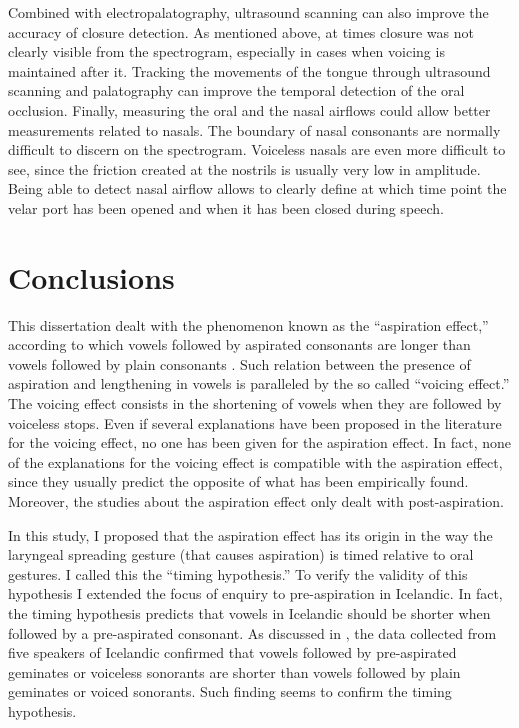 \documentclass[11pt,a4paper,oneside,openany]{memoir}\usepackage[]{graphicx}\usepackage[]{color}
\begin{document}
Combined with electropalatography, ultrasound scanning can also improve the accuracy of closure detection.
As mentioned above, at times closure was not clearly visible from the spectrogram, especially in cases when voicing is maintained after it.
Tracking the movements of the tongue through ultrasound scanning and palatography can improve the temporal detection of the oral occlusion.
Finally, measuring the oral and the nasal airflows could allow better measurements related to nasals.
The boundary of nasal consonants are normally difficult to discern on the spectrogram.
Voiceless nasals are even more difficult to see, since the friction created at the nostrils is usually very low in amplitude.
Being able to detect nasal airflow allows to clearly define at which time point the velar port has been opened and when it has been closed during speech.

















\chapter{Conclusions}
\label{c:conclusions}

This dissertation dealt with the phenomenon known as the ``aspiration effect,'' according to which vowels followed by aspirated consonants are longer than vowels followed by plain consonants \citep{maddieson1976,maddieson1976a}.
Such relation between the presence of aspiration and lengthening in vowels is paralleled by the so called ``voicing effect.''
The voicing effect consists in the shortening of vowels when they are followed by voiceless stops.
Even if several explanations have been proposed in the literature for the voicing effect, no one has been given for the aspiration effect.
In fact, none of the explanations for the voicing effect is compatible with the aspiration effect, since they usually predict the opposite of what has been empirically found.
Moreover, the studies about the aspiration effect only dealt with post-aspiration.

In this study, I proposed that the aspiration effect has its origin in the way the laryngeal spreading gesture (that causes aspiration) is timed relative to oral gestures.
I called this the ``timing hypothesis.''
To verify the validity of this hypothesis I extended the focus of enquiry to pre-aspiration in Icelandic.
In fact, the timing hypothesis predicts that vowels in Icelandic should be shorter when followed by a pre-aspirated consonant.
As discussed in , the data collected from five speakers of Icelandic confirmed that vowels followed by pre-aspirated geminates or voiceless sonorants are shorter than vowels followed by plain geminates or voiced sonorants.
Such finding seems to confirm the timing hypothesis.
\end{document}
